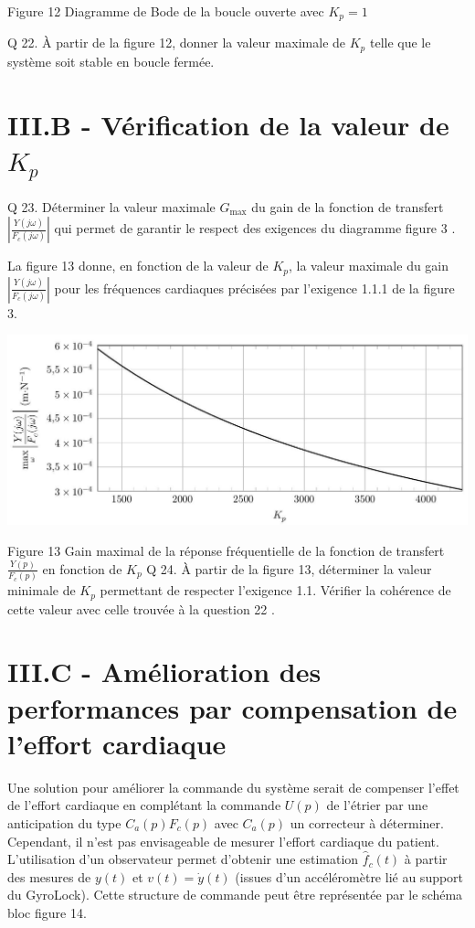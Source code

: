 \documentclass[10pt]{article}
\begin{document}
Figure 12 Diagramme de Bode de la boucle ouverte avec $K_{p}=1$

Q 22. À partir de la figure 12, donner la valeur maximale de $K_{p}$ telle que le système soit stable en boucle fermée.

\section{III.B - Vérification de la valeur de $K_{p}$}
Q 23. Déterminer la valeur maximale $G_{\max }$ du gain de la fonction de transfert $\left|\frac{Y(j \omega)}{F_{c}(j \omega)}\right|$ qui permet de garantir le respect des exigences du diagramme figure 3 .

La figure 13 donne, en fonction de la valeur de $K_{p}$, la valeur maximale du gain $\left|\frac{Y(j \omega)}{F_{c}(j \omega)}\right|$ pour les fréquences cardiaques précisées par l'exigence 1.1.1 de la figure 3.

\begin{center}
\includegraphics[max width=\textwidth]{2023_07_26_54f5e859400a10e656ddg-08}
\end{center}

Figure 13 Gain maximal de la réponse fréquentielle de la fonction de transfert $\frac{Y(p)}{F_{c}(p)}$ en fonction de $K_{p}$ Q 24. À partir de la figure 13, déterminer la valeur minimale de $K_{p}$ permettant de respecter l'exigence 1.1. Vérifier la cohérence de cette valeur avec celle trouvée à la question 22 .

\section{III.C - Amélioration des performances par compensation de l'effort cardiaque}
Une solution pour améliorer la commande du système serait de compenser l'effet de l'effort cardiaque en complétant la commande $U(p)$ de l'étrier par une anticipation du type $C_{a}(p) F_{c}(p)$ avec $C_{a}(p)$ un correcteur à déterminer. Cependant, il n'est pas envisageable de mesurer l'effort cardiaque du patient. L'utilisation d'un observateur permet d'obtenir une estimation $\hat{f}_{c}(t)$ à partir des mesures de $y(t)$ et $v(t)=\dot{y}(t)$ (issues d'un accéléromètre lié au support du GyroLock). Cette structure de commande peut être représentée par le schéma bloc figure 14.
\end{document}
